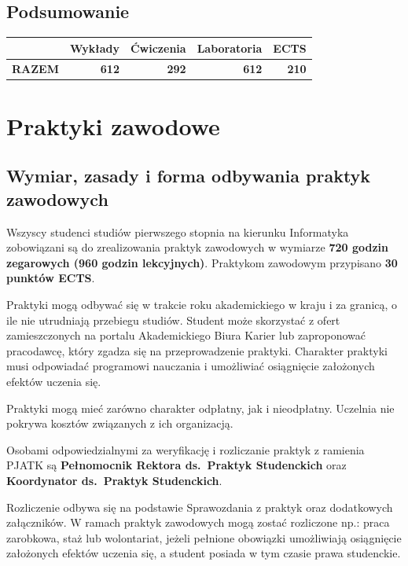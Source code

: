 \documentclass[12pt,a4paper]{article}
\begin{document}
\subsection*{Podsumowanie}

\begin{tabular}{lrrrr}
\toprule
\rowcolor{pjatkRed} {\color{white}} & {\color{white}\textbf{Wykłady}} & {\color{white}\textbf{Ćwiczenia}} & {\color{white}\textbf{Laboratoria}} & {\color{white}\textbf{ECTS}} \\
\midrule
\textbf{RAZEM} & \textbf{612} & \textbf{292} & \textbf{612} & \textbf{210} \\
\bottomrule
\end{tabular}



\newpage

\section{Praktyki zawodowe}

\subsection*{Wymiar, zasady i forma odbywania praktyk zawodowych}

Wszyscy studenci studiów pierwszego stopnia na kierunku Informatyka zobowiązani są do zrealizowania praktyk zawodowych w wymiarze \textbf{720 godzin zegarowych (960 godzin lekcyjnych)}. Praktykom zawodowym przypisano \textbf{30 punktów ECTS}.

Praktyki mogą odbywać się w trakcie roku akademickiego w kraju i za granicą, o ile nie utrudniają przebiegu studiów. Student może skorzystać z ofert zamieszczonych na portalu Akademickiego Biura Karier lub zaproponować pracodawcę, który zgadza się na przeprowadzenie praktyki. Charakter praktyki musi odpowiadać programowi nauczania i umożliwiać osiągnięcie założonych efektów uczenia się.

Praktyki mogą mieć zarówno charakter odpłatny, jak i nieodpłatny. Uczelnia nie pokrywa kosztów związanych z ich organizacją.

Osobami odpowiedzialnymi za weryfikację i rozliczanie praktyk z ramienia PJATK są \textbf{Pełnomocnik Rektora ds.~Praktyk Studenckich} oraz \textbf{Koordynator ds.~Praktyk Studenckich}.

Rozliczenie odbywa się na podstawie Sprawozdania z praktyk oraz dodatkowych załączników. W ramach praktyk zawodowych mogą zostać rozliczone np.: praca zarobkowa, staż lub wolontariat, jeżeli pełnione obowiązki umożliwiają osiągnięcie założonych efektów uczenia się, a student posiada w tym czasie prawa studenckie.
\end{document}
